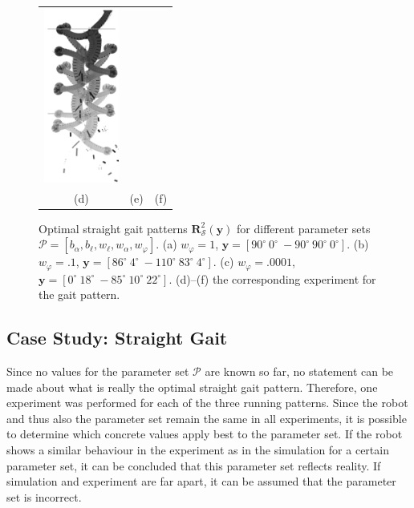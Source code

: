 \documentclass[letterpaper,10pt,conference]{ieeeconf}  %
\begin{document}
\begin{figure}
\begin{center}
\begin{tabular}{ccc}
\includegraphics[width=2.45cm]{../Pics/experiment/straight_c.png} \\
(d) & (e) & (f)\\
\end{tabular}


\caption{Optimal straight gait patterns $\bm{R}_\mathcal{S}^2(\bm{y})$ for different parameter sets $\mathcal{P} = [b_\alpha, b_\ell, w_\ell, w_\alpha, w_\varphi]$.
(a) $w_\varphi = 1$, $\bm{y}=[90^\circ~0^\circ~-90^\circ~90^\circ~0^\circ]$.
(b) $w_\varphi = .1$, $\bm{y}=[86^\circ~4^\circ~-110^\circ~83^\circ~4^\circ]$.
(c) $w_\varphi = .0001$, $\bm{y}=[0^\circ~18^\circ~-85^\circ~10^\circ~22^\circ]$.
(d)--(f) the corresponding experiment for the gait pattern.}
\label{fig:opt_straight_gait}
\end{center}
\end{figure}


\subsection{Case Study: Straight Gait}

%
Since no values for the parameter set $\mathcal{P}$ are known so far, no statement can be made about what is really the optimal straight gait pattern.
Therefore, one experiment was performed for each of the three running patterns.
Since the robot and thus also the parameter set remain the same in all experiments, it is possible to determine which concrete values apply best to the parameter set.
If the robot shows a similar behaviour in the experiment as in the simulation for a certain parameter set, it can be concluded that this parameter set reflects reality.
If simulation and experiment are far apart, it can be assumed that the parameter set is incorrect.
\end{document}
